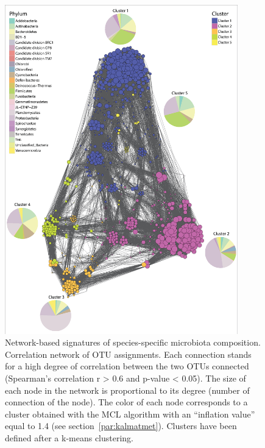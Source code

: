 \begin{figure}[!tb]
	\centering
	\includegraphics[width=0.9\textwidth]{./figures/Chapter_6/Figure_3_talkaled.eps}
  	\caption{Network-based signatures of species-specific microbiota composition. Correlation network of OTU assignments. Each connection stands for a high degree of correlation between the two OTUs connected (Spearman's correlation r {\textgreater} 0.6 and p-value {\textless} 0.05). The size of each node in the network is proportional to its degree (number of connection of the node). The color of each node corresponds to a cluster obtained with the MCL algorithm with an ``inflation value'' equal to 1.4 (see section~\ref{par:kalmatmet}). Clusters have been defined after a k-means clustering.\label{fig:3talkal}}
\end{figure}%

